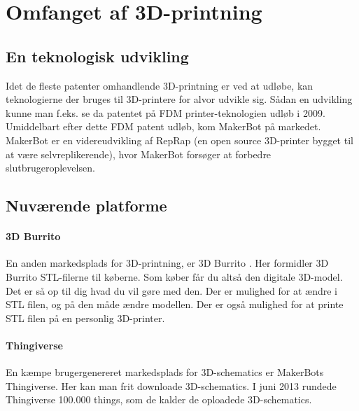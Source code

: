 \section{Omfanget af 3D-printning} %

\subsection{En teknologisk udvikling} %

Idet de fleste patenter omhandlende 3D-printning er ved at udløbe, kan teknologierne der bruges til 3D-printere for alvor udvikle sig. Sådan en udvikling kunne man f.eks. se da patentet på FDM printer-teknologien udløb i 2009. \autocite{manyika_disruptive_2013} Umiddelbart efter dette FDM patent udløb, kom MakerBot på markedet. MakerBot er en videreudvikling af RepRap (en open source 3D-printer bygget til at være selvreplikerende), hvor MakerBot forsøger at forbedre slutbrugeroplevelsen. \autocite{_makerbot_2013}


\subsection{Nuværende platforme} %


\paragraph{3D Burrito} %
\label{par:3d_burrito}

En anden markedsplads for 3D-printning, er 3D Burrito \autocite{_3d_2013-1}. Her formidler 3D Burrito STL-filerne til køberne. Som køber får du altså den digitale 3D-model. Det er så op til dig hvad du vil gøre med den. Der er mulighed for at ændre i STL filen, og på den måde ændre modellen. Der er også mulighed for at printe STL filen på en personlig 3D-printer.


\paragraph{Thingiverse} %
\label{par:thingiverse}

En kæmpe brugergenereret markedsplads for 3D-schematics er MakerBots Thingiverse. Her kan man frit downloade 3D-schematics. I juni 2013 rundede Thingiverse 100.000 things, som de kalder de oploadede 3D-schematics. \autocite{_100000th_????}

